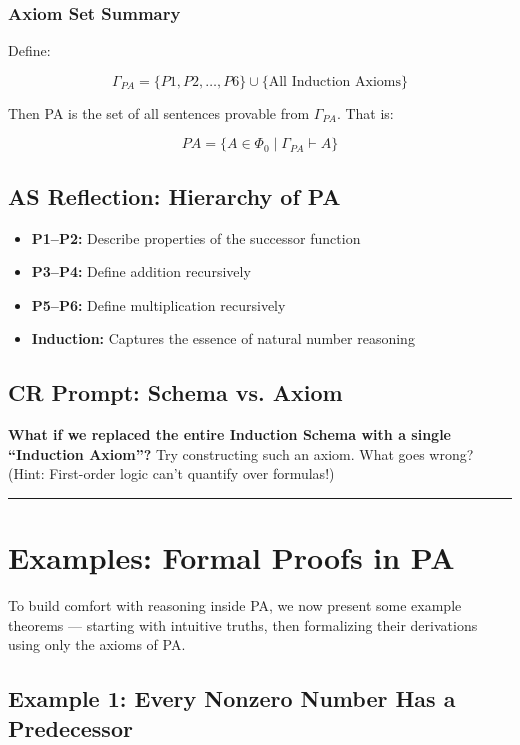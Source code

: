 \documentclass[12pt]{article}
\begin{document}
\subsubsection*{Axiom Set Summary}

Define:

\[
\Gamma_{PA} = \{ P1, P2, \dots, P6 \} \cup \{ \text{All Induction Axioms} \}
\]

Then PA is the set of all sentences provable from \( \Gamma_{PA} \). That is:

\[
PA = \{ A \in \Phi_0 \mid \Gamma_{PA} \vdash A \}
\]

\subsection*{AS Reflection: Hierarchy of PA}

\begin{itemize}
  \item \textbf{P1–P2:} Describe properties of the successor function
  \item \textbf{P3–P4:} Define addition recursively
  \item \textbf{P5–P6:} Define multiplication recursively
  \item \textbf{Induction:} Captures the essence of natural number reasoning
\end{itemize}

\subsection*{CR Prompt: Schema vs. Axiom}

\textbf{What if we replaced the entire Induction Schema with a single ``Induction Axiom''?}  
Try constructing such an axiom. What goes wrong? (Hint: First-order logic can’t quantify over formulas!)

\vspace{1em}
\hrule
\vspace{1em}

\section{Examples: Formal Proofs in PA}

To build comfort with reasoning inside PA, we now present some example theorems — starting with intuitive truths, then formalizing their derivations using only the axioms of PA.

\subsection{Example 1: Every Nonzero Number Has a Predecessor}
\end{document}
